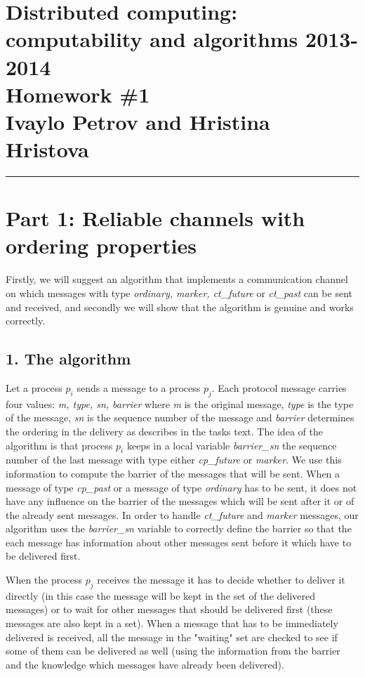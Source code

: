 \documentclass[12pt]{article}
\newcommand{\hr}{\rule{\linewidth}{0.1mm}}
\theoremstyle{plain}
\begin{document}
\section*{\centering
  Distributed computing: computability and algorithms 2013-2014 \\
  Homework \#1 \\
  Ivaylo Petrov and Hristina Hristova 
}

\hr

\section*{\textbf{Part 1: Reliable channels with ordering properties}
}

Firstly, we will suggest an algorithm that implements a communication channel 
on which messages with type \emph{ordinary, marker, ct\_future} or 
\emph{ct\_past} can be sent and received, and secondly we will show that the
algorithm is genuine and works correctly.

\subsection*{1. The algorithm}

Let a process $p_i$ sends a message to a process $p_j$. Each protocol message
carries four values: \emph{m, type, sn, barrier} where \emph{m} is the original
message, \emph{type} is the type of the message, \emph{sn} is the sequence
number of the message and \emph{barrier} determines the ordering in the
delivery as describes in the tasks text.  The idea of the algorithm is that
process $p_i$ keeps in a local variable \emph{barrier\_sn} the sequence number
of the last message with type either \emph{cp\_future} or \emph{marker}. We use
this information to compute the barrier of the messages that will be sent. When
a message of type \emph{cp\_past} or a message of type \emph{ordinary} has to
be sent, it does not have any influence on the barrier of the messages which
will be sent after it or of the already sent messages. In order to handle
\emph{ct\_future} and \emph{marker} messages, our algorithm uses the
\emph{barrier\_sn} variable to correctly define the barrier so that the each
message has information about other messages sent before it which have to be
delivered first.  

When the process $p_j$ receives the message it has to decide whether to
deliver it directly (in this case the message will be kept in the set of the
delivered messages) or to wait for other messages that should be delivered first
(these messages are also kept in a set). When a message that has to be
immediately delivered is received, all the message in the "waiting" set are
checked to see if some of them can be delivered as well (using the information
from the barrier and the knowledge which messages have already been delivered).
\end{document}
